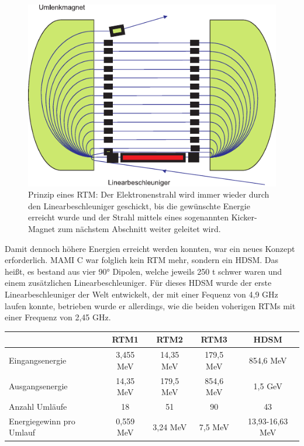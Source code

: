 \documentclass[a4paper,11pt,oneside,final,german,openbib,pdftex]{scrbook}
\begin{document}
{\begin{figure}[h!]
	\begin{center}
	\includegraphics{RTM}	
	\caption{Prinzip eines RTM: Der Elektronenstrahl wird immer wieder durch den Linearbeschleuniger geschickt, bis die gew\"unschte Energie erreicht wurde und der Strahl mittels eines sogenannten Kicker-Magnet zum n\"achstem Abschnitt weiter geleitet wird.\cite{KPh07} }
	\label{fig.RTM}
\end{center}
\end{figure}

Damit dennoch h\"ohere Energien erreicht werden konnten, war ein neues Konzept erforderlich. MAMI C war folglich kein RTM mehr, sondern ein HDSM. Das hei{\ss}t, es bestand aus vier 90° Dipolen, welche jeweils 250 t schwer waren und einem zus\"atzlichen Linearbeschleuniger. F\"ur dieses HDSM wurde der erste Linearbeschleuniger der Welt entwickelt, der mit einer Fequenz von 4,9 GHz laufen konnte, betrieben wurde er allerdings, wie die beiden voherigen RTMs mit einer Frequenz von 2,45 GHz.

\begin{table}[h!]
\centering


		\begin{tabular}{|l|c|c|c|c|}
			\hline
			& RTM1 & RTM2 & RTM3 & HDSM \\
			\hline
			\hline
			Eingangsenergie &3,455 MeV  &  14,35 MeV& 179,5 MeV  &854,6 MeV \\ \hline
			Ausgangsenergie &14,35 MeV  &  179,5 MeV &854,6 MeV  & 1,5 GeV \\ \hline
			Anzahl Uml\"aufe&18  &51  &90  &43 \\ \hline
			Energiegewinn pro Umlauf &0,559 MeV  & 3,24 MeV & 7,5 MeV  & 13,93-16,63 MeV \\ \hline
			

\end{tabular}
\end{table}}
\end{document}
